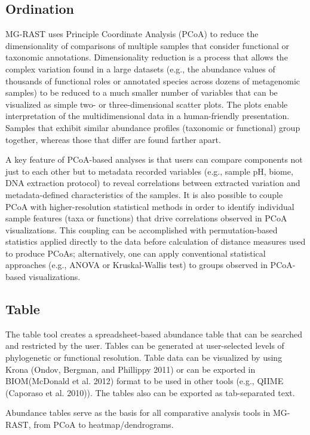\documentclass[letterpaper,10pt,english]{sphinxmanual}
\begin{document}
\subsection{Ordination}
\label{\detokenize{user_manual:ordination}}
MG-RAST uses Principle Coordinate Analysis (PCoA) to reduce the
dimensionality of comparisons of multiple samples that consider
functional or taxonomic annotations. Dimensionality reduction is a
process that allows the complex variation found in a large datasets
(e.g., the abundance values of thousands of functional roles or
annotated species across dozens of metagenomic samples) to be reduced to
a much smaller number of variables that can be visualized as simple two-
or three-dimensional scatter plots. The plots enable interpretation of
the multidimensional data in a human-friendly presentation. Samples that
exhibit similar abundance profiles (taxonomic or functional) group
together, whereas those that differ are found farther apart.

A key feature of PCoA-based analyses is that users can compare
components not just to each other but to metadata recorded variables
(e.g., sample pH, biome, DNA extraction protocol) to reveal correlations
between extracted variation and metadata-defined characteristics of the
samples. It is also possible to couple PCoA with higher-resolution
statistical methods in order to identify individual sample features
(taxa or functions) that drive correlations observed in PCoA
visualizations. This coupling can be accomplished with permutation-based
statistics applied directly to the data before calculation of distance
measures used to produce PCoAs; alternatively, one can apply
conventional statistical approaches (e.g., ANOVA or Kruskal-Wallis test)
to groups observed in PCoA-based visualizations.


\subsection{Table}
\label{\detokenize{user_manual:table}}
The table tool creates a spreadsheet-based abundance table that can be
searched and restricted by the user. Tables can be generated at
user-selected levels of phylogenetic or functional resolution. Table
data can be visualized by using Krona (Ondov, Bergman, and Phillippy
2011) or can be exported in BIOM(McDonald et al. 2012) format to be used
in other tools (e.g., QIIME (Caporaso et al. 2010)). The tables also can
be exported as tab-separated text.

Abundance tables serve as the basis for all comparative analysis tools
in MG-RAST, from PCoA to heatmap/dendrograms.
\end{document}
